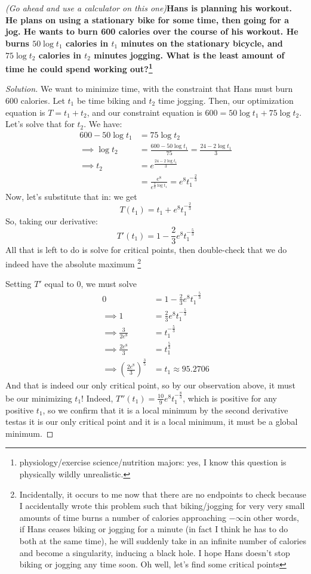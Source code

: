 \documentclass[english,fleqn]{article}
\newcommand{\prob}[1]{\setcounter{section}{#1-1}\section{}}
\theoremstyle{remark}
\theoremstyle{definition}
\begin{document}
	\prob{11} \emph{(Go ahead and use a calculator on this one\textellipsis)}\newline\textbf{Hans is planning his workout. He plans on using a stationary bike for some time, then going for a jog. He wants to burn 600 calories over the course of his workout. He burns $50\log t_1$ calories in $t_1$ minutes on the stationary bicycle, and $75\log t_2$ calories in $t_2$ minutes jogging. What is the least amount of time he could spend working out?\footnote{physiology/exercise science/nutrition majors: yes, I know this question is physically wildly unrealistic.}}
\begin{proof}[Solution]
	We want to minimize time, with the constraint that Hans must burn 600 calories. Let $t_1$ be time biking and $t_2$ time jogging. Then, our optimization equation is $T=t_1+t_2$, and our constraint equation is $600=50\log t_1+75\log t_2$. Let's solve that for $t_2$. We have:\begin{align*}
	600-50\log t_1&=75\log t_2\\
	\implies \log t_2&=\frac{600-50\log t_1}{75}=\frac{24-2\log t_1}{3}\\
	\implies t_2&=e^{\frac{24-2\log t_1}{3}}\\&=\frac{e^8}{e^{\frac{2}{3}\log t_1}}=e^8t_1^{-\frac{2}{3}}
	\end{align*}
	Now, let's substitute that in: we get $$T(t_1)=t_1+e^8t_1^{-\frac{2}{3}}$$
	So, taking our derivative:
	$$T'(t_1)=1-\frac{2}{3}e^8t_1^{-\frac{5}{3}}$$
	All that is left to do is solve for critical points, then double-check that we do indeed have the absolute maximum \footnote{Incidentally, it occurs to me now that there are no endpoints to check because I accidentally wrote this problem such that biking/jogging for very very small amounts of time burns a number of calories approaching $-\infty$\textemdash in other words, if Hans ceases biking or jogging for a minute (in fact I think he has to do both at the same time), he will suddenly take in an infinite number of calories and become a singularity, inducing a black hole. I hope Hans doesn't stop biking or jogging any time soon. Oh well, let's find some critical points}
	
	Setting $T'$ equal to $0$, we must solve \begin{align*}
		0&=1-\frac{2}{3}e^8t_1^{-\frac{5}{3}}\\
		\implies 1&=\frac{2}{3}e^8t_1^{-\frac{5}{3}}\\
		\implies \frac{3}{2e^8}&=t_1^{-\frac{5}{3}}\\
		\implies \frac{2e^8}{3}&=t_1^\frac{5}{3}\\
		\implies \left(\frac{2e^8}{3}\right)^\frac{3}{5}&=t_1\approx 95.2706
	\end{align*}
	And that is indeed our only critical point, so by our observation above, it must be our minimizing $t_1$! Indeed, $T''(t_1)=\frac{10}{9}e^8t_1^{-\frac{8}{3}}$, which is positive for any positive $t_1$, so we confirm that it is a local minimum by the second derivative test\textemdash as it is our only critical point and it is a local minimum, it must be a global minimum.
	

\end{proof}
\end{document}

